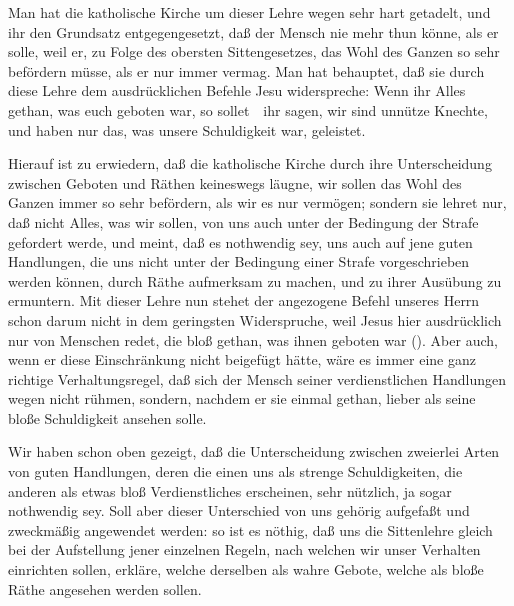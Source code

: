 \begin{RWanm} 
Man hat die katholische Kirche um dieser Lehre wegen sehr hart getadelt, und ihr den Grundsatz entgegengesetzt, daß der Mensch nie mehr thun könne, als er solle, weil er, zu Folge des obersten Sittengesetzes, das Wohl des Ganzen so sehr befördern müsse, als er nur immer vermag. Man hat behauptet, daß sie durch diese Lehre dem ausdrücklichen Befehle Jesu widerspreche: Wenn ihr Alles gethan, was euch geboten war, so sollet~\ ihr sagen, wir sind unnütze Knechte, und haben nur das, was unsere Schuldigkeit war, geleistet. \par
Hierauf ist zu erwiedern, daß die katholische Kirche durch ihre Unterscheidung zwischen Geboten und Räthen keineswegs läugne, wir sollen das Wohl des Ganzen immer so sehr befördern, als wir es nur vermögen; sondern sie lehret nur, daß nicht Alles, was wir sollen, von uns auch unter der Bedingung der Strafe gefordert werde, und meint, daß es nothwendig sey, uns auch auf jene guten Handlungen, die uns nicht unter der Bedingung einer Strafe vorgeschrieben werden können, durch Räthe aufmerksam zu machen, und zu ihrer Ausübung zu ermuntern. Mit dieser Lehre nun stehet der angezogene Befehl unseres Herrn schon darum nicht in dem geringsten Widerspruche, weil Jesus hier ausdrücklich nur von Menschen redet, die bloß gethan, was ihnen geboten war (). Aber auch, wenn er diese Einschränkung nicht beigefügt hätte, wäre es immer eine ganz richtige Verhaltungsregel, daß sich der Mensch seiner verdienstlichen Handlungen wegen nicht rühmen, sondern, nachdem er sie einmal gethan, lieber als seine bloße Schuldigkeit ansehen solle. 
\end{RWanm}

Wir haben schon oben gezeigt, daß die Unterscheidung zwischen zweierlei Arten von guten Handlungen, deren die einen uns als strenge Schuldigkeiten, die anderen als etwas bloß Verdienstliches erscheinen, sehr nützlich, ja sogar nothwendig sey. Soll aber dieser Unterschied von uns gehörig aufgefaßt und zweckmäßig angewendet werden: so ist es nöthig, daß uns die Sittenlehre gleich bei der Aufstellung jener einzelnen Regeln, nach welchen wir unser Verhalten einrichten sollen, erkläre, welche derselben als wahre Gebote, welche als bloße Räthe angesehen werden sollen.


